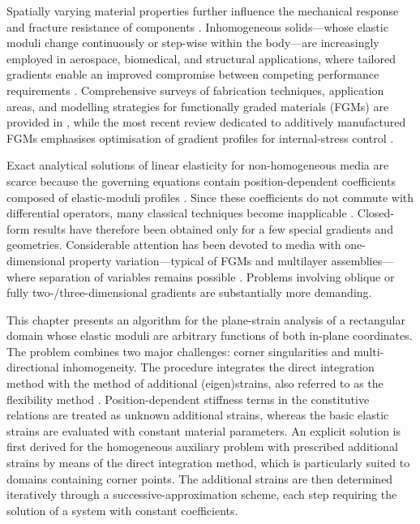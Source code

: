 Spatially varying material properties further influence the mechanical response and fracture resistance of components \cite{Yuzvyak8,Yuzvyak15,Yuzvyak18}.  
Inhomogeneous solids—whose elastic moduli change continuously or step-wise within the body—are increasingly employed in aerospace, biomedical, and structural applications, where tailored gradients enable an improved compromise between competing performance requirements \cite{Yuzvyak9,Yuzvyak27}.  
Comprehensive surveys of fabrication techniques, application areas, and modelling strategies for functionally graded materials (FGMs) are provided in \cite{Yuzvyak6,Yuzvyak13}, while the most recent review dedicated to additively manufactured FGMs emphasises optimisation of gradient profiles for internal-stress control \cite{Yuzvyak1}.

Exact analytical solutions of linear elasticity for non-homogeneous media are scarce because the governing equations contain position-dependent coefficients composed of elastic-moduli profiles \cite{Yuzvyak27,Yuzvyak28}.  
Since these coefficients do not commute with differential operators, many classical techniques become inapplicable \cite{Yuzvyak19}.  
Closed-form results have therefore been obtained only for a few special gradients and geometries.  
Considerable attention has been devoted to media with one-dimensional property variation—typical of FGMs and multilayer assemblies—where separation of variables remains possible \cite{Yuzvyak14,Yuzvyak25}.  
Problems involving oblique \cite{Yuzvyak11,Yuzvyak12,Yuzvyak17} or fully two-/three-dimensional gradients \cite{Yuzvyak34} are substantially more demanding.

This chapter presents an algorithm for the plane-strain analysis of a rectangular domain whose elastic moduli are arbitrary functions of both in-plane coordinates.  
The problem combines two major challenges: corner singularities and multi-directional inhomogeneity.  
The procedure integrates the direct integration method \cite{Yuzvyak35} with the method of additional (eigen)strains, also referred to as the flexibility method \cite{Yuzvyak2,Yuzvyak5,Yuzvyak21,Yuzvyak22}.  
Position-dependent stiffness terms in the constitutive relations are treated as unknown additional strains, whereas the basic elastic strains are evaluated with constant material parameters.  
An explicit solution is first derived for the homogeneous auxiliary problem with prescribed additional strains by means of the direct integration method, which is particularly suited to domains containing corner points.  
The additional strains are then determined iteratively through a successive-approximation scheme, each step requiring the solution of a system with constant coefficients.

